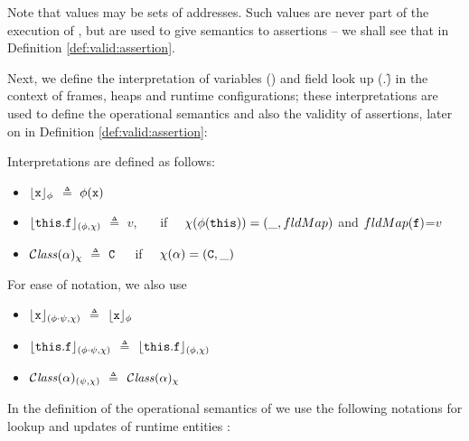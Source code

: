 Note that values may be sets of addresses. Such values are never part of the execution of \LangOO, but are used to give semantics to assertions -- we shall see that in Definition \ref{def:valid:assertion}.



Next, we define the interpretation of variables (\x) and   field look up  (\this.\f) in the context of frames, 
heaps and runtime configurations; these interpretations are used to define the operational semantics and  also  the 
validity of assertions, later on in Definition \ref{def:valid:assertion}:

\begin{definition}[Interpretations]
Interpretations are defined as follows:

\begin{itemize}
\item 
${\lfloor{ {{\mbox{\tt{x}}}}}\rfloor_{\phi}} $ $\triangleq$ $\phi({\mbox{\tt{x}}})$  
\item
${\lfloor{ {{\mbox{\tt{this}}}.{\mbox{\tt{f}}}}}\rfloor_{(\phi,\chi)}} $ $\triangleq$ $v$, \ \ \ if \ \ $\chi(\phi({\mbox{\tt{this}}}))=(\_, fldMap)$ and $fldMap({\mbox{\tt{f}}})$=$v$ 
\item
${\mathcal C}{\mathit{lass}}(\alpha)_{\chi} $ $\triangleq$ ${\mbox{\tt{C}}}$\  \ \ if \ \ $\chi(\alpha)=({\mbox{\tt{C}}},\_)$ 

\end{itemize}

\noindent
For ease of notation, we also use
\begin{itemize}
\item
${\lfloor{ {{\mbox{\tt{x}}}}}\rfloor_{(\phi\cdot\psi,\chi)}} $ $\triangleq$ ${\lfloor{ {{\mbox{\tt{x}}}}}\rfloor_{\phi}} $
\item
${\lfloor{ {{\mbox{\tt{this}}}.{\mbox{\tt{f}}}}}\rfloor_{(\phi\cdot\psi,\chi)}} $ $\triangleq$ ${\lfloor{ {{\mbox{\tt{this}}}.{\mbox{\tt{f}}}}}\rfloor_{(\phi,\chi)}} $
\item
${\mathcal C}{\mathit{lass}}(\alpha)_{(\psi,\chi)} $ $\triangleq$ ${\mathcal C}{\mathit{lass}}(\alpha)_{\chi} $ 
\end{itemize}

\end{definition}

In the definition of the operational semantics of \LangOO we use the following notations for lookup and updates of runtime entities : 

